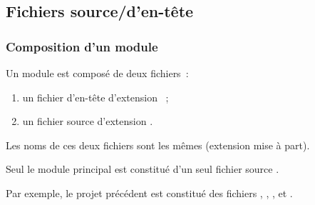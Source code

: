 \subsection{Fichiers source/d'en-tête}

\begin{frame}[fragile]
\frametitle{Composition d'un module}
Un module est composé de deux fichiers~:
\begin{enumerate}
    \item un \alert{fichier d'en-tête} d'extension ~;
    \item un \alert{fichier source} d'extension .
\end{enumerate}
\medskip

Les noms de ces deux fichiers sont les mêmes (extension mise à part).
\medskip

\begin{center}
\end{center}

Seul le module principal est constitué d'un seul fichier source .
\begin{center}
\end{center}
\bigskip

Par exemple, le projet précédent est constitué des fichiers
, , , 
et .
\end{frame}

